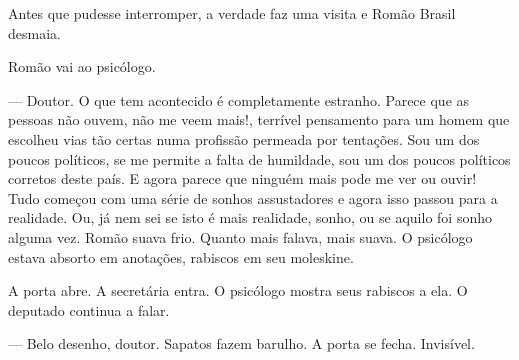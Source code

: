 Antes que pudesse interromper, a verdade faz uma visita e Romão Brasil desmaia.



Romão vai ao psicólogo.

--- Doutor. O que tem acontecido é completamente estranho. Parece que as pessoas não ouvem, não me veem mais!, terrível pensamento para um homem que escolheu vias tão certas numa profissão permeada por tentações. Sou um dos poucos políticos, se me permite a falta de humildade, sou um dos poucos políticos corretos deste país. E agora parece que ninguém mais pode me ver ou ouvir! Tudo começou com uma série de sonhos assustadores e agora isso passou para a realidade. Ou, já nem sei se isto é mais realidade, sonho, ou se aquilo foi sonho alguma vez. Romão suava frio. Quanto mais falava, mais suava. O psicólogo estava absorto em anotações, rabiscos em seu moleskine.

A porta abre. A secretária entra. O psicólogo mostra seus rabiscos a ela. O deputado continua a falar.

--- Belo desenho, doutor. Sapatos fazem barulho. A porta se fecha. Invisível.
